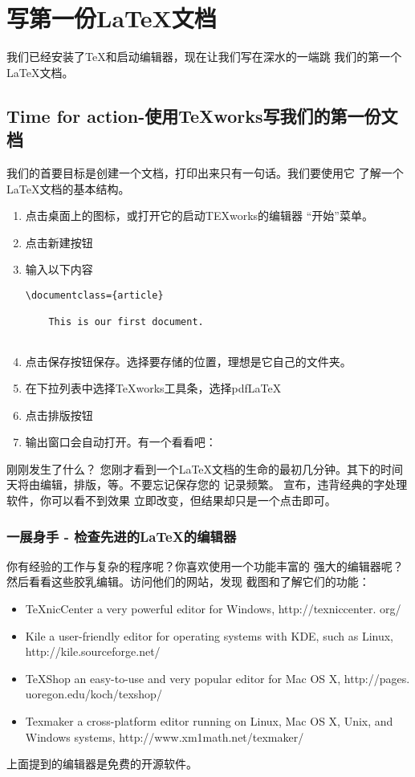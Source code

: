 \section{写第一份LaTeX文档}
我们已经安装了TeX和启动编辑器，现在让我们写在深水的一端跳
我们的第一个LaTeX文档。
	\subsection{Time for action-使用TeXworks写我们的第一份文档}
	我们的首要目标是创建一个文档，打印出来只有一句话。我们要使用它
	了解一个LaTeX文档的基本结构。
	\begin{enumerate}
		\item {点击桌面上的图标，或打开它的启动TEXworks的编辑器
			“开始”菜单。}
		\item {点击新建按钮}
		\item {输入以下内容}
\begin{lstlisting}[language={[LaTeX]TeX}]
	\documentclass={article}
	
	This is our first document.
	
\end{lstlisting}
		\item {点击保存按钮保存。选择要存储的位置，理想是它自己的文件夹。}
		\item {在下拉列表中选择TeXworks工具条，选择pdfLaTeX}
		\item {点击排版按钮}
		\item {输出窗口会自动打开。有一个看看吧：}
	\end{enumerate}
	刚刚发生了什么？
	您刚才看到一个LaTeX文档的生命的最初几分钟。其下的时间
	天将由编辑，排版，等。不要忘记保存您的
	记录频繁。
	宣布，违背经典的字处理软件，你可以看不到效果
	立即改变，但结果却只是一个点击即可。	


	\subsubsection{一展身手 - 检查先进的LaTeX的编辑器}
	你有经验的工作与复杂的程序呢？你喜欢使用一个功能丰富的
	强大的编辑器呢？然后看看这些胶乳编辑。访问他们的网站，发现
	截图和了解它们的功能：
	\begin{itemize}
		\item {TeXnicCenter}
			a very powerful editor for Windows, http://texniccenter.
			org/

		\item {Kile}
			a user-friendly editor for operating systems with KDE, such as Linux,
			http://kile.sourceforge.net/

		\item {TeXShop}
			an easy-to-use and very popular editor for Mac OS X, http://pages.
			uoregon.edu/koch/texshop/

		\item {Texmaker}
			a cross-platform editor running on Linux, Mac OS X, Unix, and
			Windows systems, http://www.xm1math.net/texmaker/

	\end{itemize}
	上面提到的编辑器是免费的开源软件。
